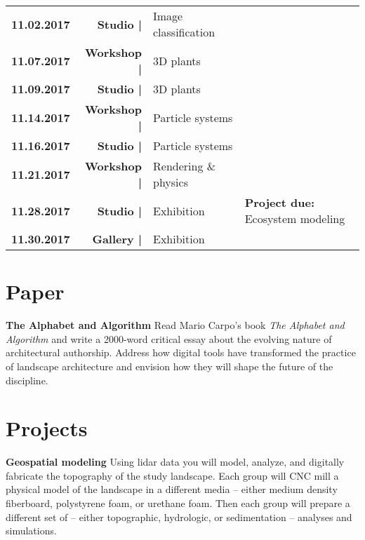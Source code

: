 \documentclass[11pt,article,oneside]{memoir}
\begin{document}
\begin{table}[H]
\begin{tabular}{l r @{\hskip 0.1cm} l @{\hskip 0.5cm} l}
\textbf{11.02.2017} & \textbf{Studio |} & Image classification & \\
%
\textbf{11.07.2017} & \textbf{Workshop |} & 3D plants & \\
\textbf{11.09.2017} & \textbf{Studio |} & 3D plants & \\
%
\textbf{11.14.2017} & \textbf{Workshop |} & Particle systems & \\
\textbf{11.16.2017} & \textbf{Studio |} & Particle systems & \\
%
\textbf{11.21.2017} & \textbf{Workshop |} & Rendering \& physics & \\
%
%
\textbf{11.28.2017} & \textbf{Studio |} & Exhibition & \textbf{Project due:} Ecosystem modeling\\
\textbf{11.30.2017} & \textbf{Gallery |} & Exhibition & \\
%
\end{tabular}
\end{table}

\clearpage

\section{Paper}
\noindent \textbf{The Alphabet and Algorithm}
Read Mario Carpo's book \emph{The Alphabet and Algorithm}
and write a 2000-word critical essay about
the evolving nature of architectural authorship.
Address how digital tools have transformed 
the practice of landscape architecture
and envision how they will shape 
the future of the discipline. 

\nocite{*} \printbibliography[keyword=intro, heading=none]


\section{Projects}

\noindent \textbf{Geospatial modeling}
Using lidar data you will model, analyze, and digitally fabricate
the topography of the study landscape. 
%
Each group will CNC mill a physical model of the landscape
in a different media -- either medium density fiberboard, 
polystyrene foam, or urethane foam.
Then each group will prepare a different set of 
-- either topographic, hydrologic, or sedimentation -- 
analyses and simulations.\\
\end{document}
